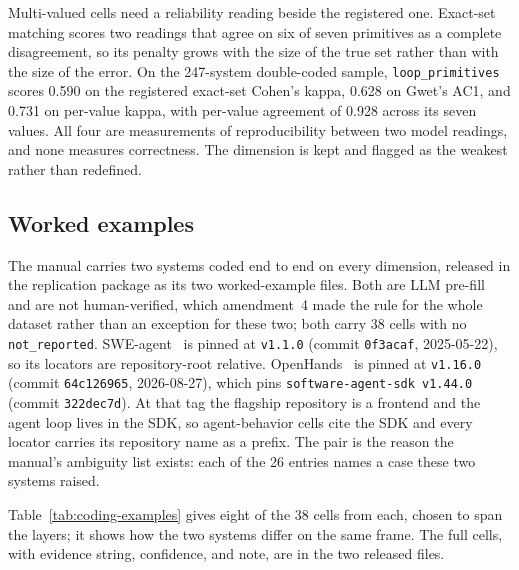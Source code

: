 Multi-valued cells need a reliability reading beside the registered one. Exact-set matching scores two
readings that agree on six of seven primitives as a complete disagreement, so its penalty grows with the
size of the true set rather than with the size of the error. On the 247-system double-coded sample,
\texttt{loop\_primitives} scores 0.590 on the registered exact-set Cohen's kappa, 0.628 on Gwet's AC1,
and 0.731 on per-value kappa, with per-value agreement of 0.928 across its seven values. All four are
measurements of reproducibility between two model readings, and none measures correctness. The
dimension is kept and flagged as the weakest rather than redefined.

\subsection{Worked examples}
\label{subsec:coding-examples}

The manual carries two systems coded end to end on every dimension, released in the replication package
as its two worked-example files. Both are LLM pre-fill and are not human-verified, which amendment~4
made the rule for the whole dataset rather than an exception for these two; both carry 38 cells with no
\texttt{not\_reported}. SWE-agent~\citep{yang2024sweagent} is pinned at \texttt{v1.1.0} (commit
\texttt{0f3acaf}, 2025-05-22), so its locators are repository-root relative.
OpenHands~\citep{wang2024openhands} is pinned at \texttt{v1.16.0} (commit \texttt{64c126965},
2026-08-27), which pins \texttt{software-agent-sdk v1.44.0} (commit \texttt{322dec7d}). At that tag the
flagship repository is a frontend and the agent loop lives in the SDK, so agent-behavior cells cite the
SDK and every locator carries its repository name as a prefix. The pair is the reason the manual's
ambiguity list exists: each of the 26 entries names a case these two systems raised.

Table~\ref{tab:coding-examples} gives eight of the 38 cells from each, chosen to span the layers; it
shows how the two systems differ on the same frame. The full cells, with evidence string, confidence,
and note, are in the two released files.

